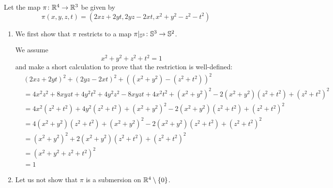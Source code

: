 \documentclass[a4paper, 12pt]{article}
\begin{document}
\begin{Exercise}
    Let the map $\pi \colon \R^4 \to \R^3$ be given by
    \[
        \pi(x, y, z, t) = (2xz + 2yt, 2yz - 2xt, x^2 + y^2 - z^2 - t^2)
    \]
    \begin{enumerate}[label=(\roman*)]
        \item
            We first show that $\pi$ restricts to a map $\pi|_{\S^3} \colon \S^3 \to \S^2$.

            We assume
            \[
                x^2 + y^2 + z^2 + t^2 = 1
            \]
            and make a short calculation to prove that the restriction is well-defined:
            \begin{align*}
                &(2xz + 2yt)^2 + (2yz - 2xt)^2 + ((x^2 + y^2) - (z^2 + t^2))^2 \\
                &= 4x^2z^2 + 8xyzt + 4y^2t^2 + 4y^2z^2 - 8xyzt + 4x^2t^2 + (x^2 + y^2)^2 -2(x^2 + y^2)(z^2 + t^2) + (z^2 + t^2)^2 \\
                &= 4x^2(z^2 + t^2) + 4y^2(z^2 + t^2) + (x^2 + y^2)^2 -2(x^2 + y^2)(z^2 + t^2) + (z^2 + t^2)^2 \\
                &= 4(x^2 + y^2)(z^2 + t^2) + (x^2 + y^2)^2 -2(x^2 + y^2)(z^2 + t^2) + (z^2 + t^2)^2 \\
                &= (x^2 + y^2)^2 +2(x^2 + y^2)(z^2 + t^2) + (z^2 + t^2)^2 \\
                &= (x^2 + y^2 + z^2 + t^2)^2 \\
                &= 1
            \end{align*}
        \item
            Let us not show that $\pi$ is a submersion on $\R^4\setminus\lbrace 0 \rbrace$.


\end{enumerate}
\end{Exercise}
\end{document}
